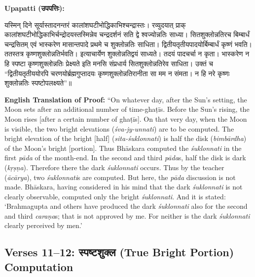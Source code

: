 \documentclass[11pt,a4paper]{article}
\newcommand{\dev}[1]{{\devanagarifont #1}}
\newenvironment{sanskritverse}{%
  \begin{center}\begin{minipage}{0.95\textwidth}
  \setlength{\leftskip}{1em}
  \setlength{\rightskip}{1em}
  \dev
}{\end{minipage}\end{center}}
\newenvironment{paracol}[1]{\begingroup}{\endgroup}
\newcommand{\switchcolumn}[1][]{%
  \ifnum#1=0\relax\else\par\nobreak\vspace{0.5em}\par\nobreak\fi%
}
\begin{document}
\begin{paracol}{2}

\noindent\textbf{Upapatti (\dev{उपपत्तिः}):}
\begin{sanskritverse}
यस्मिन् दिने सूर्यास्तादनन्तरं कालांशघटीभोद्धिकाभिश्चन्द्रास्तः। रव्युदयात् प्राक्
कालांशघटीभोद्धिकाभिर्चन्द्रोदयस्तस्मिन्नेव चन्द्रदर्शनं सति द्वे श्वज्योन्नतिः साध्या।
सितशुक्लोन्नतिरच बिम्बार्धं चन्द्रसितम् एवं भास्करेण मासान्तपादे प्रथमे च
शुक्लोन्नतिः साधिता। द्वितीयतृतीयपादयोर्बिम्बार्धं कृष्णं भवति। ततस्तत्र
कृष्णशुक्लोन्नतिर्भवति। इत्याचार्येण शुक्लोन्नतिद्वयं साध्यते। तदयं पादचर्चा न
कृता। भास्करेण न हि स्पष्टा कृष्णशुक्लोन्नतिः प्रेक्ष्यते इति मनसि संप्रधार्य
सितशुक्लोन्नतिरेव साधिता। उक्तं च ``द्वितीयतृतीययोरपि चरणयोर्ब्रह्मगुप्तादयः कृष्णशुक्लोन्नतिरानीता सा मम न संमता। न हि नरे कृष्णः शुक्लोन्नतिः स्पष्टोपलक्ष्यते''॥
\end{sanskritverse}

\switchcolumn

\textbf{English Translation of Proof:} ``On whatever day, after the Sun's setting, the Moon sets after an additional number of time-ghaṭīs. Before the Sun's rising, the Moon rises [after a certain number of ghaṭīs]. On that very day, when the Moon is visible, the two bright elevations (\textit{śva-jy-unnati}) are to be computed. The bright elevation of the bright [half] (\textit{sita-śuklonnati}) is half the disk (\textit{bimbārdha}) of the Moon's bright [portion]. Thus Bhāskara computed the \textit{śuklonnati} in the first \textit{pāda} of the month-end. In the second and third \textit{pāda}s, half the disk is dark (\textit{kṛṣṇa}). Therefore there the dark \textit{śuklonnati} occurs. Thus by the teacher (\textit{ācārya}), two \textit{śuklonnati}s are computed. But here, the \textit{pāda} discussion is not made. Bhāskara, having considered in his mind that the dark \textit{śuklonnati} is not clearly observable, computed only the bright \textit{śuklonnati}. And it is stated: `Brahmagupta and others have produced the dark \textit{śuklonnati} also for the second and third \textit{caraṇa}s; that is not approved by me. For neither is the dark \textit{śuklonnati} clearly perceived by men.'

\end{paracol}

\subsection{Verses 11--12: {\devanagarifont स्पष्टशुक्ल} (True Bright Portion) Computation}
\end{document}
